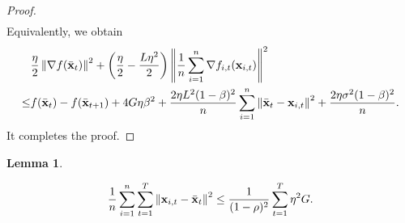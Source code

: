 \documentclass{article}
\newtheorem{Lemma}{\bf{Lemma}}
\begin{document}
\begin{proof}
\begin{align}
\end{align} Equivalently, we obtain
\begin{align}
\nonumber
& \frac{\eta}{2}\left\lVert\nabla f(\bar{{\bf x}}_t)\right\rVert^2 + \left( \frac{\eta}{2} - \frac{L\eta^2}{2} \right)\left\lVert\frac{1}{n}\sum_{i=1}^n \nabla f_{i,t}({\bf x}_{i,t})\right\rVert^2 \\ \nonumber 
\le & f(\bar{{\bf x}}_t) - f(\bar{{\bf x}}_{t+1}) + 4G\eta\beta^2 +  \frac{2\eta L^2(1-\beta)^2}{n}\sum_{i=1}^n\left\lVert\bar{{\bf x}}_t - {\bf x}_{i,t} \right\rVert^2 + \frac{2\eta\sigma^2(1-\beta)^2}{n}.
\end{align} It completes the proof.



\end{proof}


\begin{Lemma}
\label{lemma_x_variance_norm_square}

\begin{align}
\nonumber
\frac{1}{n}\sum_{i=1}^n \sum_{t=1}^T \left\lVert{\bf x}_{i,t} - \bar{{\bf x}}_t\right\rVert^2 \le \frac{1}{(1-\rho)^2} \sum_{t=1}^T \eta^2 G.
\end{align}

\end{Lemma}
\end{document}
